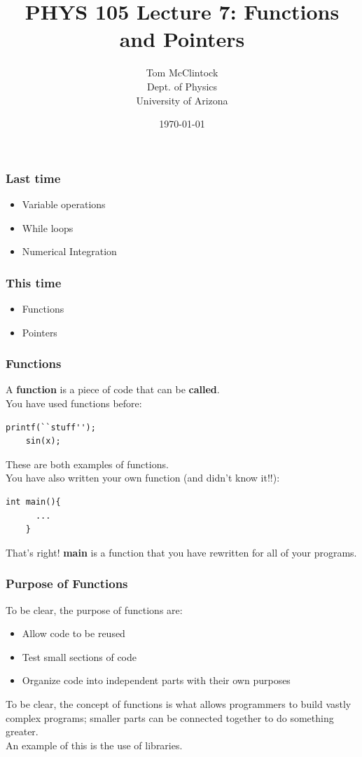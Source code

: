 \documentclass{beamer}
\title{PHYS 105 Lecture 7: Functions and Pointers}
\author{Tom McClintock \\
	Dept. of Physics\\
	University of Arizona
}
\date{\today}
\begin{document}
\begin{frame}
  \titlepage
\end{frame}

\begin{frame}
  \frametitle{Last time}
  \begin{itemize}
    \item Variable operations
    \item While loops
    \item Numerical Integration
  \end{itemize}
\end{frame}

\begin{frame}
  \frametitle{This time}
  \begin{itemize}
    \item Functions
    \item Pointers
  \end{itemize}
\end{frame}

\begin{frame}[fragile]
  \frametitle{Functions}
  A \textbf{function} is a piece of code that can be \textbf{called}.\\
  You have used functions before:
  \begin{lstlisting}[style=customc]
    printf(``stuff'');
    sin(x);
  \end{lstlisting}
  These are both examples of functions.\\
  You have also written your own function (and didn't know it!!):
  \begin{lstlisting}[style=customc]
    int main(){
      ...
    }
  \end{lstlisting}
  That's right! \textbf{main} is a function that you have 
  rewritten for all of your programs.
\end{frame}

\begin{frame}
  \frametitle{Purpose of Functions}
  To be clear, the purpose of functions are:
  \begin{itemize}
    \item Allow code to be reused
    \item Test small sections of code
    \item Organize code into independent parts with their own purposes
  \end{itemize}
  To be clear, the concept of functions is what allows 
  programmers to build vastly complex programs; smaller parts can be
  connected together to do something greater.\\
  An example of this is the use of libraries.
\end{frame}
\end{document}
